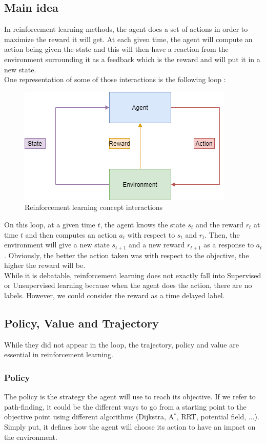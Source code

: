\documentclass[a4paper,12pt,calibri,oneside,openany]{book}
\theoremstyle{break}
\begin{document}
\subsection{Main idea}
In reinforcement learning methods, the agent does a set of actions in order to maximize the reward it will get. At each given time, the agent will compute an action being given the state and this will then have a reaction from the environment surrounding it as a feedback which is the reward and will put it in a new state.\\

One representation of some of those interactions is the following loop :
\begin{figure}[H]
	\centering\includegraphics[width=0.6\linewidth]{RLSchema}
	\caption{Reinforcement learning concept interactions}
\end{figure}

On this loop, at a given time $t$, the agent knows the state $s_t$ and the reward $r_t$ at time $t$ and then computes an action $a_t$ with respect to $s_t$ and $r_t$. Then, the environment will give a new state $s_{t+1}$ and a new reward $r_{t+1}$ as a response to $a_t$. Obviously, the better the action taken was with respect to the objective, the higher the reward will be.\\

While it is debatable, reinforcement learning does not exactly fall into Supervised or Unsupervised learning because when the agent does the action, there are no labels. However, we could consider the reward as a time delayed label.
\subsection{Policy, Value and Trajectory}
While they did not appear in the loop, the trajectory, policy and value are essential in reinforcement learning.\\
\subsubsection{Policy}
\qquad The policy is the strategy the agent will use to reach its objective. If we refer to path-finding, it could be the different ways to go from a starting point to the objective point using different algorithms (Dijkstra, A$^*$, RRT, potential field, ...). Simply put, it defines how the agent will choose its action to have an impact on the environment. \\
\end{document}
